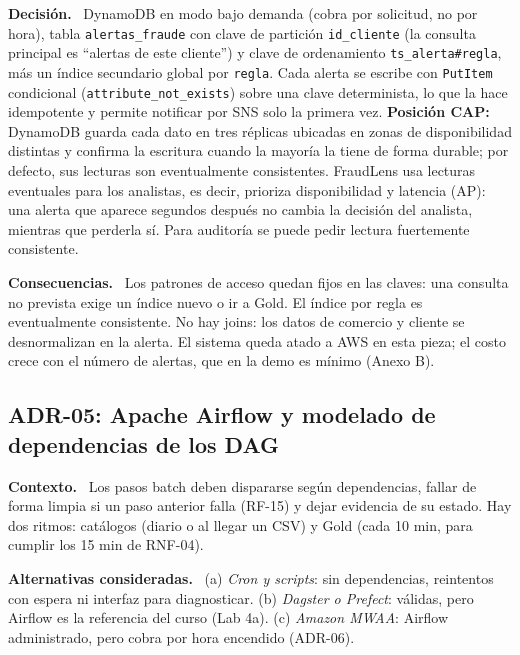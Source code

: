 \documentclass[12pt,letterpaper]{article}
\newcommand{\code}[1]{{\small\texttt{#1}}}
\newcommand{\adrpart}[1]{\textbf{#1.}~}
\begin{document}
\adrpart{Decisión} DynamoDB en modo bajo demanda (cobra por solicitud, no por hora), tabla \code{alertas\_fraude} con clave de partición \code{id\_cliente} (la consulta principal es ``alertas de este cliente'') y clave de ordenamiento \code{ts\_alerta\#regla}, más un índice secundario global por \code{regla}. Cada alerta se escribe con \code{PutItem} condicional (\code{attribute\_not\_exists}) sobre una clave determinista, lo que la hace idempotente y permite notificar por SNS solo la primera vez. \textbf{Posición CAP:} DynamoDB guarda cada dato en tres réplicas ubicadas en zonas de disponibilidad distintas y confirma la escritura cuando la mayoría la tiene de forma durable; por defecto, sus lecturas son eventualmente consistentes. FraudLens usa lecturas eventuales para los analistas, es decir, prioriza disponibilidad y latencia (AP): una alerta que aparece segundos después no cambia la decisión del analista, mientras que perderla sí. Para auditoría se puede pedir lectura fuertemente consistente.

\adrpart{Consecuencias} Los patrones de acceso quedan fijos en las claves: una consulta no prevista exige un índice nuevo o ir a Gold. El índice por regla es eventualmente consistente. No hay joins: los datos de comercio y cliente se desnormalizan en la alerta. El sistema queda atado a AWS en esta pieza; el costo crece con el número de alertas, que en la demo es mínimo (Anexo B).

\subsection*{ADR-05: Apache Airflow y modelado de dependencias de los DAG}

\adrpart{Contexto} Los pasos batch deben dispararse según dependencias, fallar de forma limpia si un paso anterior falla (RF-15) y dejar evidencia de su estado. Hay dos ritmos: catálogos (diario o al llegar un CSV) y Gold (cada 10 min, para cumplir los 15 min de RNF-04).

\adrpart{Alternativas consideradas} (a) \emph{Cron y scripts}: sin dependencias, reintentos con espera ni interfaz para diagnosticar. (b) \emph{Dagster o Prefect}: válidas, pero Airflow es la referencia del curso (Lab 4a). (c) \emph{Amazon MWAA}: Airflow administrado, pero cobra por hora encendido (ADR-06).
\end{document}
